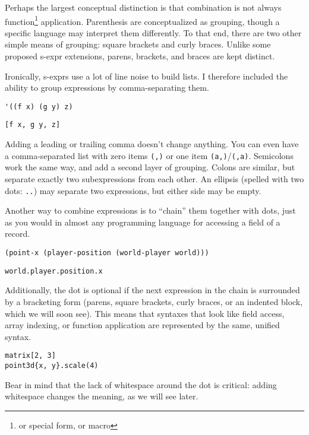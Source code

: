 \documentclass[11pt]{article} %
\begin{document}
Perhaps the largest conceptual distinction is that combination is not always function\footnote{or special form, or macro} application.
Parenthesis are conceptualized as grouping, though a specific language may interpret them differently.
To that end, there are two other simple means of grouping: square brackets and curly braces.
Unlike some proposed s-expr extensions, parens, brackets, and braces are kept distinct.

Ironically, s-exprs use a lot of line noise to build lists.
I therefore included the ability to group expressions by comma-separating them.
\begin{center}
\begin{verbatim}
'((f x) (g y) z)
\end{verbatim}
\begin{verbatim}
[f x, g y, z]
\end{verbatim}
\end{center}
Adding a leading or trailing comma doesn't change anything.
You can even have a comma-separated list with zero items \texttt{(,)} or one item \texttt{(a,)}/\texttt{(,a)}.
Semicolons work the same way, and add a second layer of grouping.
Colons are similar, but separate exactly two subexpressions from each other.
An ellipsis (spelled with two dots: \texttt{..}) may separate two expressions, but either side may be empty.

Another way to combine expressions is to ``chain'' them together with dots, just as you would in almost any programming language for accessing a field of a record.
\begin{center}
\begin{verbatim}
(point-x (player-position (world-player world)))
\end{verbatim}
\begin{verbatim}
world.player.position.x
\end{verbatim}
\end{center}
Additionally, the dot is optional if the next expression in the chain is surrounded by a bracketing form (parens, square brackets, curly braces, or an indented block, which we will soon see).
This means that syntaxes that look like field access, array indexing, or function application are represented by the same, unified syntax.
\begin{center}
\begin{verbatim}
matrix[2, 3]
point3d{x, y}.scale(4)
\end{verbatim}
\end{center}
Bear in mind that the lack of whitespace around the dot is critical: adding whitespace changes the meaning, as we will see later.
\end{document}
